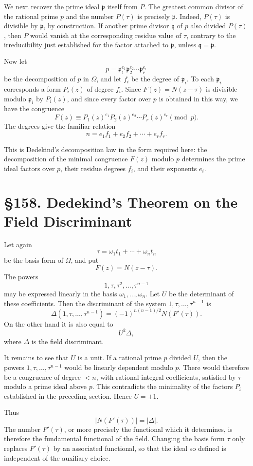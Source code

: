 \documentclass[11pt,a4paper]{book}
\newcommand{\webersection}[2]{\clearpage\section*{\S #1. #2}}
\newcommand{\p}{\mathfrak p}
\newcommand{\q}{\mathfrak q}
\begin{document}
We next recover the prime ideal \(\p\) itself from \(P\).  The greatest common divisor of the rational prime \(p\) and the number \(P(\tau)\) is precisely \(\p\).  Indeed, \(P(\tau)\) is divisible by \(\p\), by construction.  If another prime divisor \(\q\) of \(p\) also divided \(P(\tau)\), then \(P\) would vanish at the corresponding residue value of \(\tau\), contrary to the irreducibility just established for the factor attached to \(\p\), unless \(\q=\p\).

Now let
\[
  p=\p_1^{e_1}\p_2^{e_2}\cdots \p_r^{e_r}
\tag{4}
\]
be the decomposition of \(p\) in \(\Omega\), and let \(f_i\) be the degree of \(\p_i\).  To each \(\p_i\) corresponds a form \(P_i(z)\) of degree \(f_i\).  Since \(F(z)=N(z-\tau)\) is divisible modulo \(\p_i\) by \(P_i(z)\), and since every factor over \(p\) is obtained in this way, we have the congruence
\[
  F(z)\equiv P_1(z)^{e_1}P_2(z)^{e_2}\cdots P_r(z)^{e_r}\pmod p.
\tag{5}
\]
The degrees give the familiar relation
\[
  n=e_1f_1+e_2f_2+\cdots+e_rf_r.
\tag{6}
\]

This is Dedekind's decomposition law in the form required here: the decomposition of the minimal congruence \(F(z)\) modulo \(p\) determines the prime ideal factors over \(p\), their residue degrees \(f_i\), and their exponents \(e_i\).

\webersection{158}{Dedekind's Theorem on the Field Discriminant}

Let again
\[
  \tau=\omega_1t_1+\cdots+\omega_n t_n
\]
be the basis form of \(\Omega\), and put
\[
  F(z)=N(z-\tau).
\]
The powers
\[
  1,\tau,\tau^2,\ldots,\tau^{n-1}
\]
may be expressed linearly in the basis \(\omega_1,\ldots,\omega_n\).  Let \(U\) be the determinant of these coefficients.  Then the discriminant of the system \(1,\tau,\ldots,\tau^{n-1}\) is
\[
  \Delta(1,\tau,\ldots,\tau^{n-1})
     =(-1)^{n(n-1)/2}N(F'(\tau)).
\tag{1}
\]
On the other hand it is also equal to
\[
  U^2\Delta,
\tag{2}
\]
where \(\Delta\) is the field discriminant.

It remains to see that \(U\) is a unit.  If a rational prime \(p\) divided \(U\), then the powers \(1,\tau,\ldots,\tau^{n-1}\) would be linearly dependent modulo \(p\).  There would therefore be a congruence of degree \(<n\), with rational integral coefficients, satisfied by \(\tau\) modulo a prime ideal above \(p\).  This contradicts the minimality of the factors \(P_i\) established in the preceding section.  Hence \(U=\pm1\).

Thus
\[
  |N(F'(\tau))|=|\Delta|.
\tag{3}
\]
The number \(F'(\tau)\), or more precisely the functional which it determines, is therefore the fundamental functional of the field.  Changing the basis form \(\tau\) only replaces \(F'(\tau)\) by an associated functional, so that the ideal so defined is independent of the auxiliary choice.
\end{document}
